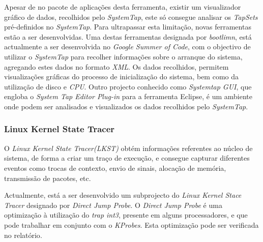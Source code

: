 Apesar de no pacote de aplicações desta ferramenta, existir um visualizador gráfico de dados, recolhidos pelo \textit{SystemTap}, este só consegue analisar os \textit{TapSets} pré-definidos no \textit{SystemTap}.
Para ultrapassar esta limitação, novas ferramentas estão a ser desenvolvidas.
Uma destas ferramentas designada por \textit{bootlimn}, está actualmente a ser desenvolvida no \textit{Google Summer of Code}, com o objectivo de utilizar o \textit{SystemTap} para recolher informações sobre o arranque do sistema, agregando estes dados no formato \textit{XML}.
Os dados recolhidos, permitem visualizações gráficas do processo de inicialização do sistema, bem como da utilização de disco e \textit{CPU}.
Outro projecto conhecido como \textit{Systemtap GUI}, que engloba o \textit{System Tap Editor Plug-in} para a ferramenta Eclipse, é um ambiente onde podem ser analisados e visualizados os dados recolhidos pelo \textit{SystemTap}.


\subsubsection{Linux Kernel State Tracer}

O \textit{Linux Kernel State Tracer(LKST)} obtém informações referentes ao núcleo de sistema, de forma a criar um traço de execução, e consegue capturar diferentes eventos como trocas de contexto, envio de sinais, alocação de memória, transmissão de pacotes, etc.

\label{cap:djprobe}
Actualmente, está a ser desenvolvido um subprojecto do \textit{Linux Kernel Stace Tracer} designado por \textit{Direct Jump Probe}.
O \textit{Direct Jump Probe} é uma optimização à utilização do \textit{trap int3}, presente em alguns processadores, e que pode trabalhar em conjunto com o \textit{KProbes}.
Esta optimização pode ser verificada no relatório\cite{Hiramatsu2005}.


